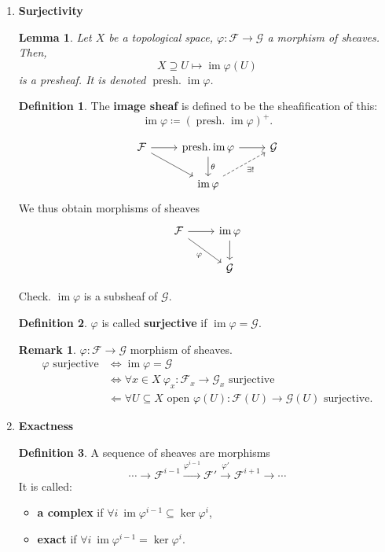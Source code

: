 \documentclass[12pt]{article}
\DeclareMathOperator{\im}{im}
\DeclareMathOperator{\presh}{presh.}
\newtheorem*{lemma}{Lemma}
\theoremstyle{definition}
\newtheorem*{definition}{Definition}
\newtheorem*{remark}{Remark}
\begin{document}
\begin{enumerate}[label=\arabic*)]
\item \textbf{Surjectivity}

\begin{lemma}
Let $X$ be a topological space, $\varphi:\mathcal{F}\rightarrow\mathcal{G}$ a morphism of sheaves. Then,
\[X\supseteq U\longmapsto\im\varphi(U)\]
is a presheaf. It is denoted $\presh\im\varphi$.
\end{lemma}

\begin{definition}
The \textbf{image sheaf} is defined to be the sheafification of this:
\[\im\varphi\coloneqq(\presh\im\varphi)^+.\]
\end{definition}

\[
\begin{tikzcd}
\mathcal{F}\arrow[r]\arrow[rd]&\presh\im\varphi\arrow[r]\arrow[d,"\theta"]&\mathcal{G}\\
&\im\varphi\arrow[ru,dashed,"\exists!",swap]
\end{tikzcd}
\]
We thus obtain morphisms of sheaves
\[
\begin{tikzcd}
\mathcal{F}\arrow[r]\arrow[rd,"\varphi",swap]&\im\varphi\arrow[d]\\
&\mathcal{G}
\end{tikzcd}
\]

Check. $\im\varphi$ is a subsheaf of $\mathcal{G}$.

\begin{definition}
$\varphi$ is called \textbf{surjective} if $\im\varphi=\mathcal{G}$.
\end{definition}

\begin{remark}
$\varphi:\mathcal{F}\rightarrow\mathcal{G}$ morphism of sheaves.
\begin{align*}
\varphi\text{ surjective}&\Longleftrightarrow\im\varphi=\mathcal{G}\\
&\Longleftrightarrow\forall x\in X\ \varphi_x:\mathcal{F}_x\rightarrow\mathcal{G}_x\text{ surjective}\\
&\Longleftarrow\forall U\subseteq X\text{ open }\varphi(U):\mathcal{F}(U)\rightarrow\mathcal{G}(U)\text{ surjective}.
\end{align*}
\end{remark}

\item \textbf{Exactness}

\begin{definition}
A sequence of sheaves are morphisms
\[\cdots\longrightarrow\mathcal{F}^{i-1}\xrightarrow{\varphi^{i-1}}\mathcal{F}'\overset{\varphi'}{\longrightarrow}\mathcal{F}^{i+1}\longrightarrow\cdots\]
It is called:
\begin{itemize}
\item \textbf{a complex} if $\forall i\ \im\varphi^{i-1}\subseteq\ker\varphi^i$,
\item \textbf{exact} if $\forall i\ \im\varphi^{i-1}=\ker\varphi^i$.
\end{itemize}
\end{definition}


\end{enumerate}
\end{document}
